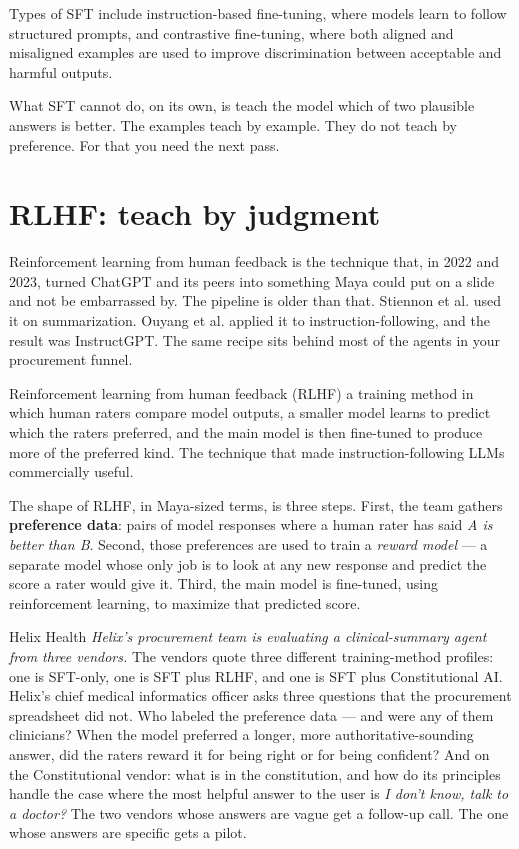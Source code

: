 Types of SFT include instruction-based fine-tuning, where models learn to follow structured prompts, and contrastive fine-tuning, where both aligned and misaligned examples are used to improve discrimination between acceptable and harmful outputs.

What SFT cannot do, on its own, is teach the model which of two plausible answers is better. The examples teach by example. They do not teach by preference. For that you need the next pass.

\section{RLHF: teach by judgment}

Reinforcement learning from human feedback is the technique that, in 2022 and 2023, turned ChatGPT and its peers into something Maya could put on a slide and not be embarrassed by. The pipeline is older than that. Stiennon et al. \citep{stiennon2020rlhf} used it on summarization. Ouyang et al. \citep{ouyang2022instructgpt} applied it to instruction-following, and the result was InstructGPT. The same recipe sits behind most of the agents in your procurement funnel.

\begin{TNdefinition}{Reinforcement learning from human feedback (RLHF)} a training method in which human raters compare model outputs, a smaller model learns to predict which the raters preferred, and the main model is then fine-tuned to produce more of the preferred kind. The technique that made instruction-following LLMs commercially useful. \end{TNdefinition}

The shape of RLHF, in Maya-sized terms, is three steps. First, the team gathers \textbf{preference data}: pairs of model responses where a human rater has said \textit{A is better than B}. Second, those preferences are used to train a \textit{reward model} --- a separate model whose only job is to look at any new response and predict the score a rater would give it. Third, the main model is fine-tuned, using reinforcement learning, to maximize that predicted score.

\begin{TNinpractice}{Helix Health} \textit{Helix's procurement team is evaluating a clinical-summary agent from three vendors.} The vendors quote three different training-method profiles: one is SFT-only, one is SFT plus RLHF, and one is SFT plus Constitutional AI. Helix's chief medical informatics officer asks three questions that the procurement spreadsheet did not. Who labeled the preference data --- and were any of them clinicians? When the model preferred a longer, more authoritative-sounding answer, did the raters reward it for being right or for being confident? And on the Constitutional vendor: what is in the constitution, and how do its principles handle the case where the most helpful answer to the user is \textit{I don't know, talk to a doctor?} The two vendors whose answers are vague get a follow-up call. The one whose answers are specific gets a pilot. \end{TNinpractice}

